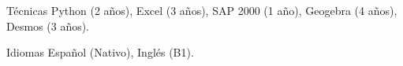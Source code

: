 \begin{cvskills}

  \cvskill
  {Técnicas} %
  {Python (2 años), Excel (3 años), SAP 2000 (1 año), Geogebra (4 años), Desmos (3 años).} %


  \cvskill
  {Idiomas} %
  {Español (Nativo), Inglés (B1).} %

\end{cvskills}
